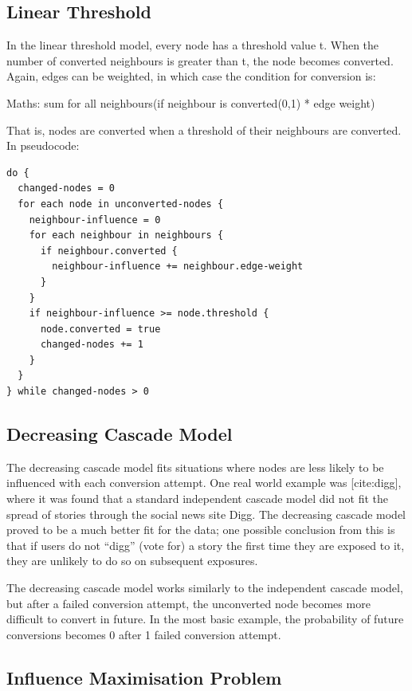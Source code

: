 \subsection{Linear Threshold}
 In the linear threshold model, every node has a threshold value t. When the number of converted neighbours is greater than t, the node becomes converted. Again, edges can be weighted, in which case the condition for conversion is:

Maths: sum for all neighbours(if neighbour is converted(0,1) * edge weight)

That is, nodes are converted when a threshold of their neighbours are converted. In pseudocode:

\begin{verbatim}
do {
  changed-nodes = 0
  for each node in unconverted-nodes {
    neighbour-influence = 0
    for each neighbour in neighbours {
      if neighbour.converted {
        neighbour-influence += neighbour.edge-weight
      }
    }
    if neighbour-influence >= node.threshold {
      node.converted = true
      changed-nodes += 1
    } 
  }
} while changed-nodes > 0
\end{verbatim}

\subsection{Decreasing Cascade Model}

The decreasing cascade model fits situations where nodes are less likely to be influenced with each conversion attempt. One real world example was [cite:digg], where it was found that a standard independent cascade model did not fit the spread of stories through the social news site Digg. The decreasing cascade model proved to be a much better fit for the data; one possible conclusion from this is that if users do not ``digg'' (vote for) a story the first time they are exposed to it, they are unlikely to do so on subsequent exposures.

The decreasing cascade model works similarly to the independent cascade model, but after a failed conversion attempt, the unconverted node becomes more difficult to convert in future. In the most basic example, the probability of future conversions becomes 0 after 1 failed conversion attempt.

\subsection{Influence Maximisation Problem}

